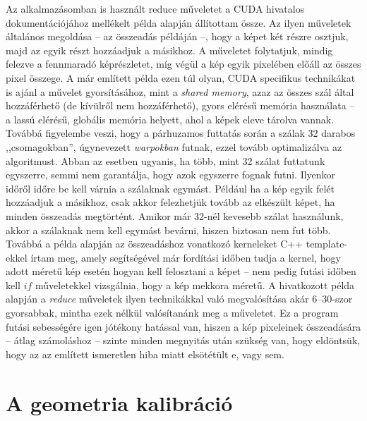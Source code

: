 \documentclass[a4paper,12pt,twoside]{article}
\begin{document}
Az alkalmazásomban is használt reduce műveletet  a CUDA hivatalos dokumentációjához mellékelt példa \cite{reduce} alapján állítottam össze. Az ilyen műveletek általános megoldása -- az összeadás példáján --, hogy a képet két részre osztjuk, majd az egyik részt hozzáadjuk a másikhoz. A műveletet folytatjuk, mindig felezve a fennmaradó képrészletet, míg végül a kép egyik pixelében előáll az összes pixel összege. A már említett példa ezen túl olyan, CUDA specifikus technikákat is ajánl a művelet gyorsításához, mint a \emph{shared memory}, azaz az összes szál által hozzáférhető (de kívülről nem hozzáférhető), gyors elérésű memória használata -- a lassú elérésű, globális memória helyett, ahol a képek eleve tárolva vannak. Továbbá figyelembe veszi, hogy a párhuzamos futtatás során a szálak 32 darabos ,,csomagokban'',  úgynevezett \emph{warpokban} futnak, ezzel tovább optimalizálva az algoritmust. Abban az esetben ugyanis, ha több, mint 32 szálat futtatunk egyszerre, semmi nem garantálja, hogy azok egyszerre fognak futni. Ilyenkor időről időre be kell várnia a szálaknak egymást. Például ha a kép egyik felét hozzáadjuk a másikhoz, csak akkor felezhetjük tovább az elkészült képet, ha minden összeadás megtörtént. Amikor már 32-nél kevesebb szálat használunk, akkor a szálaknak nem kell egymást bevárni, hiszen biztosan nem fut több. Továbbá a példa alapján az összeadáshoz vonatkozó kerneleket C++ template-ekkel írtam meg, amely segítségével már fordítási időben tudja a kernel, hogy adott méretű kép esetén hogyan kell felosztani a képet -- nem pedig futási időben kell $if$ műveletekkel vizsgálnia, hogy a kép mekkora méretű. A hivatkozott példa alapján a \emph{reduce} műveletek ilyen technikákkal való megvalósítása akár $6$--$30$-szor gyorsabbak, mintha ezek nélkül valósítanánk meg a műveletet. Ez a program futási sebességére igen jótékony hatással van, hiszen a kép pixeleinek összeadására -- átlag számoláshoz -- szinte minden megnyitás után szükség van, hogy eldöntsük, hogy az az említett ismeretlen hiba miatt elsötétült e, vagy sem. 




\section{A geometria kalibráció}
\end{document}
